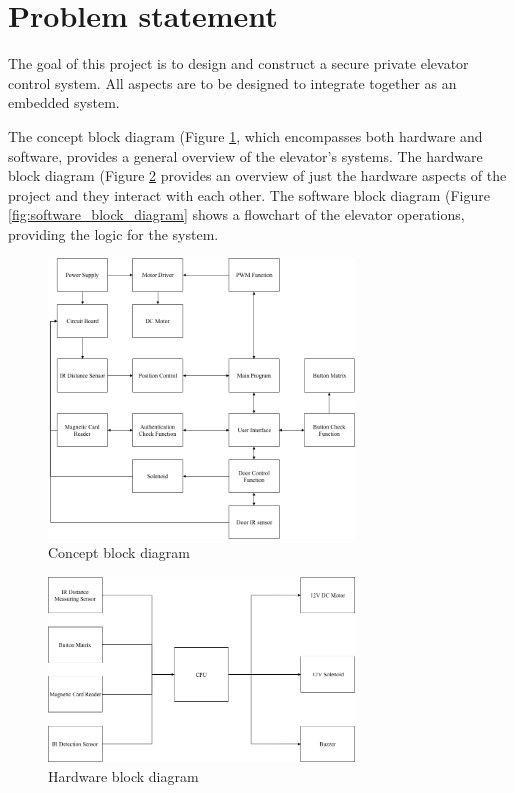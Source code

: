 \documentclass{article}
\begin{document}
	\section{Problem statement}
	The goal of this project is to design and construct a secure private elevator control system. All aspects are to be designed to integrate together as an embedded system. 
	
	The concept block diagram (Figure \ref{fig:concept_block_diagram}, which encompasses both hardware and software, provides a general overview of the elevator's systems. The hardware block diagram (Figure \ref{fig:hardware_block_diagram} provides an overview of just the hardware aspects of the project and they interact with each other. The software block diagram (Figure \ref{fig:software_block_diagram} shows a flowchart of the elevator operations, providing the logic for the system.
	
	\begin{figure}[h!]
	    \begin{center}
		\includegraphics[width=230pt]{cbd.png}
		\caption{Concept block diagram}
		\label{fig:concept_block_diagram}
		\end{center}
	\end{figure}
	
	\begin{figure}[h!]
	    \begin{center}
		\includegraphics[width=230pt]{hwbd.png}
		\caption{Hardware block diagram}
		\label{fig:hardware_block_diagram}
		\end{center}
	\end{figure}
	
\end{document}
